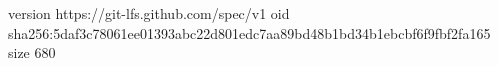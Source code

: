 version https://git-lfs.github.com/spec/v1
oid sha256:5daf3c78061ee01393abc22d801edc7aa89bd48b1bd34b1ebcbf6f9fbf2fa165
size 680
